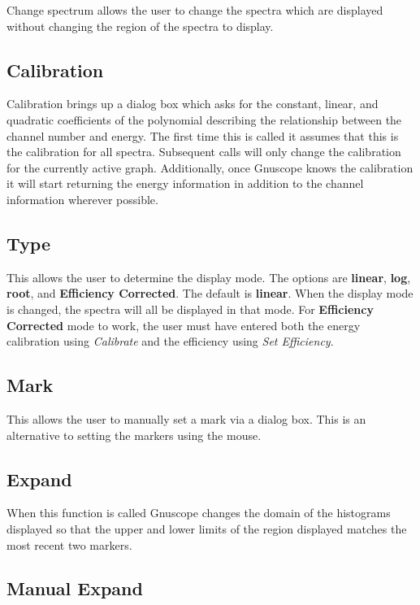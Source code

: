 Change spectrum allows the user to change the spectra which are displayed without changing the region of the spectra to display.

\subsection{Calibration}

Calibration brings up a dialog box which asks for the constant, linear, and quadratic coefficients of the polynomial describing the relationship between the channel number and energy.  The first time this is called it assumes that this is the calibration for all spectra.  Subsequent calls will only change the calibration for the currently active graph.  Additionally, once Gnuscope knows the calibration it will start returning the energy information in addition to the channel information wherever possible.

\subsection{Type}

This allows the user to determine the display mode.  The options are {\bf linear}, {\bf log}, {\bf root}, and {\bf Efficiency Corrected}.  The default is {\bf linear}.  When the display mode is changed, the spectra will all be displayed in that mode.  For {\bf Efficiency Corrected} mode to work, the user must have entered both the energy calibration using {\it Calibrate} and the efficiency using {\it Set Efficiency}.

\subsection{Mark}

This allows the user to manually set a mark via a dialog box.  This is an alternative to setting the markers using the mouse.

\subsection{Expand}

When this function is called Gnuscope changes the domain of the histograms displayed so that the upper and lower limits of the region displayed matches the most recent two markers.

\subsection{Manual Expand}

